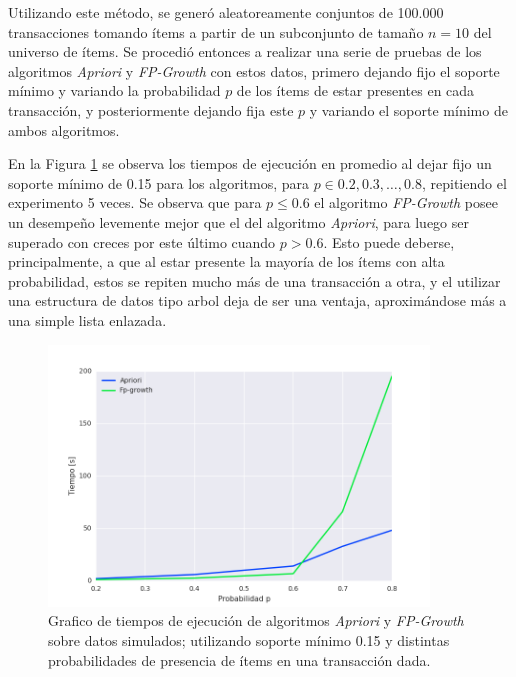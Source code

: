 Utilizando este método, se generó aleatoreamente conjuntos de 100.000 transacciones tomando ítems a partir de un subconjunto de tamaño $n = 10$ del universo de ítems. Se procedió entonces a realizar una serie de pruebas de los algoritmos \textit{Apriori} y \textit{FP-Growth} con estos datos, primero dejando fijo el soporte mínimo y variando la probabilidad $p$ de los ítems de estar presentes en cada transacción, y posteriormente dejando fija este $p$ y variando el soporte mínimo de ambos algoritmos.

En la Figura \ref{fig:sim_01} se observa los tiempos de ejecución en promedio al dejar fijo un soporte mínimo de 0.15 para los algoritmos, para $p \in {0.2, 0.3, \ldots, 0.8}$, repitiendo el experimento 5 veces. Se observa que para $p \leq 0.6$ el algoritmo \textit{FP-Growth} posee un desempeño levemente mejor que el del algoritmo \textit{Apriori}, para luego ser superado con creces por este último cuando $p > 0.6$. Esto puede deberse, principalmente, a que al estar presente la mayoría de los ítems con alta probabilidad, estos se repiten mucho más de una transacción a otra, y el utilizar una estructura de datos tipo arbol deja de ser una ventaja, aproximándose más a una simple lista enlazada.

\begin{figure}[h!]
\begin{center}
\includegraphics[width=0.9\textwidth]{imagenes/sim_01.png}
\end{center}
\vspace*{-5mm}
\caption{Grafico de tiempos de ejecución de algoritmos \textit{Apriori} y \textit{FP-Growth} sobre datos simulados; utilizando soporte mínimo 0.15 y distintas probabilidades de presencia de ítems en una transacción dada.}
\label{fig:sim_01}
\end{figure}

